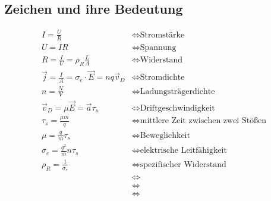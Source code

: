 \documentclass[11pt,letterpaper]{article}
\begin{document}
\subsection{Zeichen und ihre Bedeutung}
\begin{align*}
    I = \frac{U}{R}&\Longleftrightarrow \text{Stromstärke}\\
    U = I R&\Longleftrightarrow \text{Spannung}\\
    R = \frac{I}{U} = \rho_R \frac{L}{A}&\Longleftrightarrow \text{Widerstand}\\
    \vec j = \frac{I}{A} = \sigma_e \cdot \vec E = n q \vec v_D &\Longleftrightarrow \text{Stromdichte}\\
    n = \frac{N}{V}&\Longleftrightarrow \text{Ladungsträgerdichte}\\
    \vec v_D = \mu \vec E = \vec a \tau_s&\Longleftrightarrow \text{Driftgeschwindigkeit}\\
    \tau_s = \frac{\mu m }{q}&\Longleftrightarrow \text{mittlere Zeit zwischen zwei Stößen}\\
    \mu = \frac{q}{m} \tau_s&\Longleftrightarrow \text{Beweglichkeit }\\
    \sigma_e = \frac{q^2}{m}n \tau_s&\Longleftrightarrow \text{elektrische Leitfähigkeit}\\
    \rho_R = \frac{1}{\sigma_e}&\Longleftrightarrow \text{spezifischer Widerstand}\\
    &\Longleftrightarrow \text{}\\
    &\Longleftrightarrow \text{}\\
    &\Longleftrightarrow \text{}\\
\end{align*}

 
\end{document}
